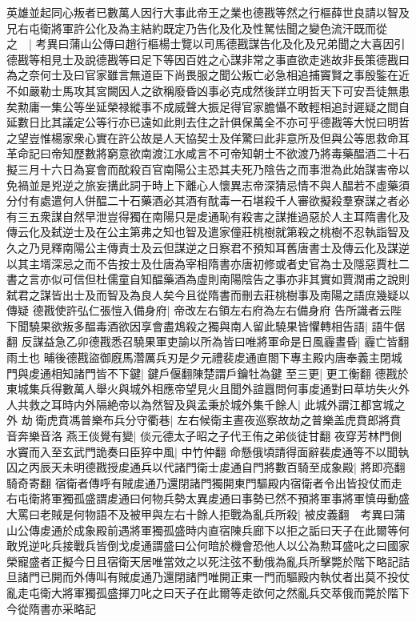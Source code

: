 英雄並起同心叛者已數萬人因行大事此帝王之業也德戡等然之行樞薛世良請以智及兄右屯衛將軍許公化及為主結約既定乃告化及化及性駑怯聞之變色流汗既而從之　|{
	考異曰蒲山公傳曰趙行樞楊士覽以司馬德戡謀告化及化及兄弟聞之大喜因引德戡等相見士及說德戡等曰足下等因百姓之心謀非常之事直欲走逃故非長策德戡曰為之奈何士及曰官家雖言無道臣下尚畏服之聞公叛亡必急相追捕竇賢之事殷鍳在近不如嚴勒士馬攻其宮闕因人之欲稱廢昏凶事必克成然後詳立明哲天下可安吾徒無患矣勲庸一集公等坐延榮禄縱事不成威聲大振足得官家膽懾不敢輕相追討遲疑之間自延數日比其議定公等行亦已遠如此則去住之計俱保萬全不亦可乎德戡等大悦曰明哲之望豈惟楊家衆心實在許公故是人天協契士及佯驚曰此非意所及但與公等思救命耳革命記曰帝知歷數將窮意欲南渡江水咸言不可帝知朝士不欲渡乃將毒藥醖酒二十石擬三月十六日為宴會而酖殺百官南陽公主恐其夫死乃陰告之而事泄為此始謀害帝以免禍並是兇逆之旅妄搆此詞于時上下離心人懷異志帝深猜忌情不與人醖若不虛藥須分付有處遣何人併醖二十石藥酒必其酒有酖毒一石堪殺千人審欲擬殺羣寮謀之者必有三五衆謀自然早泄豈得獨在南陽只是䖍通恥有殺害之謀推過惡於人主耳隋書化及傳云化及弑逆士及在公主第弗之知也智及遣家僮莊桃樹就第殺之桃樹不忍執詣智及久之乃見釋南陽公主傳責士及云但謀逆之日察君不預知耳舊唐書士及傳云化及謀逆以其主壻深忌之而不告按士及仕唐為宰相隋書亦唐初修或者史官為士及隱惡賈杜二書之言亦似可信但杜儒童自知醖藥酒為虛則南陽陰告之事亦非其實如賈潤甫之說則弑君之謀皆出士及而智及為良人矣今且從隋書而刪去莊桃樹事及南陽之語庶幾疑以傳疑}
德戡使許弘仁張愷入備身府|{
	帝改左右領左右府為左右備身府}
告所識者云陛下聞驍果欲叛多醖毒酒欲因享會盡鴆殺之獨與南人留此驍果皆懼轉相告語|{
	語牛倨翻}
反謀益急乙卯德戡悉召驍果軍吏諭以所為皆曰唯將軍命是日風霾晝昏|{
	霾亡皆翻雨土也}
晡後德戡盜御廐馬濳厲兵刃是夕元禮裴䖍通直閤下專主殿内唐奉義主閉城門與䖍通相知諸門皆不下鍵|{
	鍵戶偃翻陳楚謂戶鑰牡為鍵}
至三更|{
	更工衡翻}
德戡於東城集兵得數萬人舉火與城外相應帝望見火且聞外諠囂問何事䖍通對曰草坊失火外人共救之耳時内外隔絶帝以為然智及與孟秉於城外集千餘人|{
	此城外謂江都宮城之外}
劫衛虎賁馮普樂布兵分守衢巷|{
	左右候衛主晝夜巡察故劫之普樂盖虎賁郎將賁音奔樂音洛}
燕王倓覺有變|{
	倓元德太子昭之子代王侑之弟倓徒甘翻}
夜穿芳林門側水竇而入至玄武門詭奏曰臣猝中風|{
	中竹仲翻}
命懸俄頃請得面辭裴䖍通等不以聞執囚之丙辰天未明德戡授䖍通兵以代諸門衛士䖍通自門將數百騎至成象殿|{
	將即亮翻騎奇寄翻}
宿衛者傳呼有賊䖍通乃還閉諸門獨開東門驅殿内宿衛者令出皆投仗而走右屯衛將軍獨孤盛謂䖍通曰何物兵勢太異䖍通曰事勢已然不預將軍事將軍慎毋動盛大罵曰老賊是何物語不及被甲與左右十餘人拒戰為亂兵所殺|{
	被皮義翻　考異曰蒲山公傳䖍通於成象殿前遇將軍獨孤盛時内直宿陳兵廊下以拒之詬曰天子在此爾等何敢兇逆叱兵接戰兵皆倒戈䖍通謂盛曰公何暗於機會恐他人以公為勲耳盛叱之曰國家榮寵盛者正擬今日且宿衛天居唯當效之以死注弦不動俄為亂兵所擊斃於階下略記詰旦諸門已開而外傳叫有賊䖍通乃還閉諸門唯開正東一門而驅殿内執仗者出莫不投仗亂走屯衛大將軍獨孤盛揮刀叱之曰天子在此爾等走欲何之然亂兵交萃俄而斃於階下今從隋書亦采略記}
